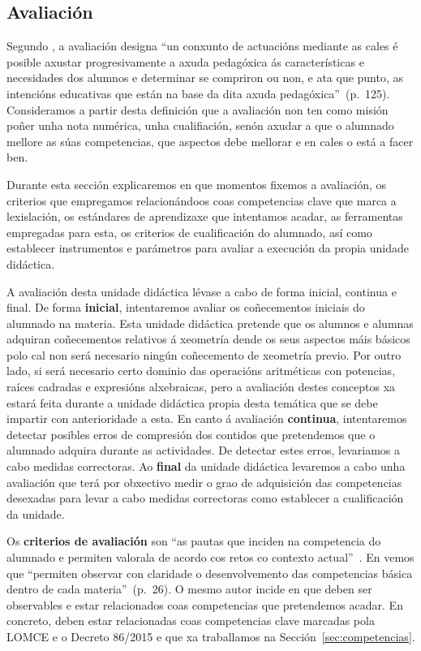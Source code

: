 \subsection{Avaliación}\label{sec:avaliacion}

Segundo , a avaliación designa ``un conxunto de actuacións mediante as cales é posible axustar progresivamente a axuda pedagóxica ás características e necesidades dos alumnos e determinar se compriron ou non, e ata que punto, as intencións educativas que están na base da dita axuda pedagóxica''~(p.~125). Consideramos a partir desta definición que a avaliación non ten como misión poñer unha nota numérica, unha cualifiación, senón axudar a que o alumnado mellore as súas competencias, que aspectos debe mellorar e en cales o está a facer ben.

Durante esta sección explicaremos en que momentos fixemos a avaliación, os criterios que empregamos relacionándoos coas competencias clave que marca a lexislación, os estándares de aprendizaxe que intentamos acadar, as ferramentas empregadas para esta, os criterios de cualificación do alumnado, así como establecer instrumentos e parámetros para avaliar a execución da propia unidade didáctica.

A avaliación desta unidade didáctica lévase a cabo de forma inicial, continua e final. De forma \textbf{inicial}, intentaremos avaliar os coñecementos iniciais do alumnado na materia. Esta unidade didáctica pretende que os alumnos e alumnas adquiran coñecementos relativos á xeometría dende os seus aspectos máis básicos polo cal non será necesario ningún coñecemento de xeometría previo. Por outro lado, si será necesario certo dominio das operacións aritméticas con potencias, raíces cadradas e expresións alxebraicas, pero a avaliación destes conceptos xa estará feita durante a unidade didáctica propia desta temática que se debe impartir con anterioridade a esta. En canto á avaliación \textbf{continua}, intentaremos detectar posibles erros de compresión dos contidos que pretendemos que o alumnado adquira durante as actividades. De detectar estes erros, levariamos a cabo medidas correctoras. Ao \textbf{final} da unidade didáctica levaremos a cabo unha avaliación que terá por obxectivo medir o grao de adquisición das competencias desexadas para levar a cabo medidas correctoras como establecer a cualificación da unidade.

Os \textbf{criterios de avaliación} son ``as pautas que inciden na competencia do alumnado e permiten valorala de acordo cos retos co contexto actual''~\cite[p. 134]{secdidac}. En  vemos que ``permiten observar con claridade o desenvolvemento das competencias básica dentro de cada materia''~(p.~26). O mesmo autor incide en que deben ser observables e estar relacionados coas competencias que pretendemos acadar. En concreto, deben estar relacionadas coas competencias clave marcadas pola LOMCE e o Decreto 86/2015 e que xa traballamos na Sección~\ref{sec:competencias}.


